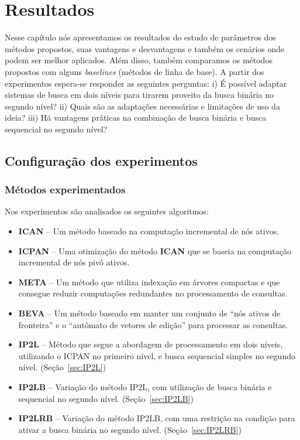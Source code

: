 \section{Resultados}
\label{sec:results}

Nesse capítulo nós apresentamos os resultados do estudo de parâmetros dos métodos propostos, suas vantagens e desvantagens e também os cenários onde podem ser melhor aplicados. Além disso, também comparamos os métodos propostos com alguns \textit{baselines} (métodos de linha de base). A partir dos experimentos espera-se responder as seguintes perguntas: i) É possível adaptar sistemas de busca em dois níveis para tirarem proveito da busca binária no segundo nível? ii) Quais são as adaptações necessárias e limitações de uso da ideia? iii) Há vantagens práticas na combinação de busca binária e busca sequencial no segundo nível?

\subsection{Configuração dos experimentos}
\label{sec:experiments-setup}

\subsubsection{Métodos experimentados}
Nos experimentos são analisados os seguintes algoritmos:
\begin{itemize}
    \item \textbf{ICAN} -- Um método baseado na computação incremental de nós ativos. \citep{ji2009efficient}
    \item \textbf{ICPAN} -- Uma otimização do método \textbf{ICAN} que se baseia na computação incremental de nós pivô ativos. \citep{li2011efficient}
    \item \textbf{META} -- Um método que utiliza indexação em árvores compactas e que consegue reduzir computações redundantes no processamento de consultas. \citep{deng2016meta}
    \item \textbf{BEVA} -- Um método baseado em manter um conjunto de ``nós ativos de fronteira'' e o ``autômato de vetores de edição'' para processar as consultas. \citep{zhou2016beva}
    \item \textbf{IP2L} -- Método que segue a abordagem de processamento em dois níveis, utilizando o ICPAN no primeiro nível, e busca sequencial simples no segundo nível. (Seção~\ref{sec:IP2L})
    \item \textbf{IP2LB} -- Variação do método IP2L, com utilização de busca binária e sequencial no segundo nível. (Seção~\ref{sec:IP2LB})
    \item \textbf{IP2LRB} -- Variação do método IP2LB, com uma restrição na condição para ativar a busca binária no segundo nível. (Seção~\ref{sec:IP2LRB})
\end{itemize}

